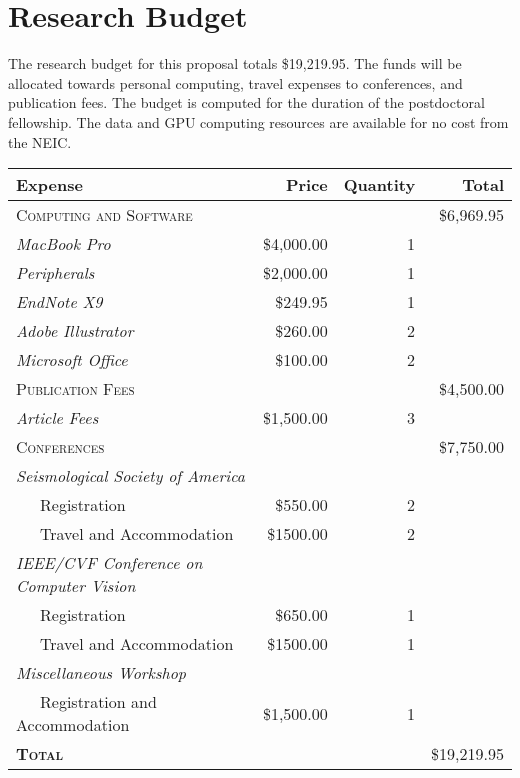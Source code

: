 \documentclass[12p]{article}
\begin{document}
\section*{Research Budget}

The research budget for this proposal totals \$19,219.95. The funds will be allocated towards personal computing, travel expenses to conferences, and publication fees. The budget is computed for the duration of the postdoctoral fellowship. The data and GPU computing resources are available for no cost from the NEIC.

\vspace{.5cm}
\begin{tabular}{lrrr}
\toprule
\textbf{Expense}                                 & \textbf{Price}       & \textbf{Quantity}      & \textbf{Total} \\
\midrule
\textsc{Computing and Software}       & & & \$6,969.95 \\
\midrule
\emph{MacBook Pro}               &      \$4,000.00        & 1           &  \\
\emph{Peripherals}               &      \$2,000.00        & 1           &  \\
\emph{EndNote X9}                &      \$249.95         & 1           &  \\
\emph{Adobe Illustrator}         &      \$260.00         & 2           &  \\
\emph{Microsoft Office}          &      \$100.00         & 2           &  \\
\midrule
\textsc{Publication Fees}            & & & \$4,500.00 \\
\midrule
\emph{Article Fees}              &      \$1,500.00        & 3           &  \\
\midrule
\textsc{Conferences}               &  &  & \$7,750.00 \\
\midrule
\emph{Seismological Society of America} & & & \\
~~~Registration               &  \$550.00             & 2           &  \\
~~~Travel and Accommodation   &  \$1500.00            & 2           &  \\
\emph{IEEE/CVF Conference on Computer Vision} & & & \\
~~~Registration               &  \$650.00             & 1           &  \\
~~~Travel and Accommodation   &  \$1500.00            & 1           &  \\
\emph{Miscellaneous Workshop} & & & \\
~~~Registration and Accommodation & \$1,500.00          & 1           &  \\
\midrule
\textbf{\textsc{Total}} & & & \$19,219.95
\end{tabular}
    
\end{document}

